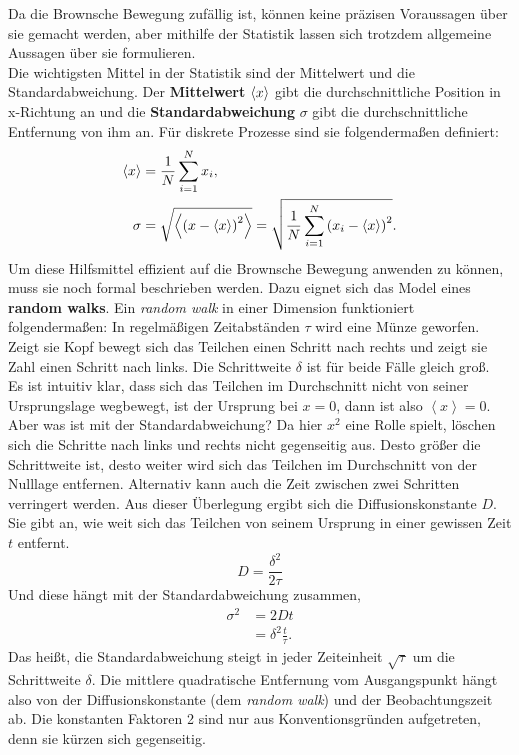 Da die Brownsche Bewegung zufällig ist, können keine präzisen Voraussagen über sie gemacht werden, aber mithilfe der Statistik lassen sich trotzdem allgemeine Aussagen über sie formulieren.\\
Die wichtigsten Mittel in der Statistik sind der Mittelwert und die Standardabweichung. Der \textbf{Mittelwert} $\left< x \right>$ gibt die durchschnittliche Position in x-Richtung an und die \textbf{Standardabweichung} $\sigma$ gibt die durchschnittliche Entfernung von ihm an. Für diskrete Prozesse sind sie folgendermaßen definiert:
\begin{align}
  \left< x \right> & = \frac{1}{N} \sum_{i=1}^{N} x_i, \\
  \sigma & = \sqrt{\left<  {\left( x - \left< x \right> \right)}^2  \right>} = \sqrt{\frac{1}{N} \sum_{i=1}^{N} {\left( x_i - \left< x \right> \right)}^2}.
\end{align}
Um diese Hilfsmittel effizient auf die Brownsche Bewegung anwenden zu können, muss sie noch formal beschrieben werden. Dazu eignet sich das Model eines \textbf{random walks}. Ein \emph{random walk} in einer Dimension funktioniert folgendermaßen: In regelmäßigen Zeitabständen $\tau$ wird eine Münze geworfen. Zeigt sie Kopf bewegt sich das Teilchen einen Schritt nach rechts und zeigt sie Zahl einen Schritt nach links. Die Schrittweite $\delta$ ist für beide Fälle gleich groß.\\
Es ist intuitiv klar, dass sich das Teilchen im Durchschnitt nicht von seiner Ursprungslage wegbewegt, ist der Ursprung bei $x = 0$, dann ist also $\left< x \right> = 0$. Aber was ist mit der Standardabweichung? Da hier $x^2$ eine Rolle spielt, löschen sich die Schritte nach links und rechts nicht gegenseitig aus.
Desto größer die Schrittweite ist, desto weiter wird sich das Teilchen im Durchschnitt von der Nulllage entfernen. Alternativ kann auch die Zeit zwischen zwei Schritten verringert werden. Aus dieser Überlegung ergibt sich die Diffusionskonstante $D$. Sie gibt an, wie weit sich das Teilchen von seinem Ursprung in einer gewissen Zeit $t$ entfernt.
\begin{equation}
  D = \frac{\delta^2}{2 \tau} \label{eq:diff}
\end{equation}
Und diese hängt mit der Standardabweichung zusammen,
\begin{align}
  \sigma^2 & = 2Dt \label{eq:stdev} \\
   & = \delta^2 \frac{t}{\tau}.
\end{align}
Das heißt, die Standardabweichung steigt in jeder Zeiteinheit $\sqrt{\tau}$ um die Schrittweite $\delta$. Die mittlere quadratische Entfernung vom Ausgangspunkt hängt also von der Diffusionskonstante (dem \emph{random walk}) und der Beobachtungszeit ab. Die konstanten Faktoren 2 sind nur aus Konventionsgründen aufgetreten, denn sie kürzen sich gegenseitig.\\


